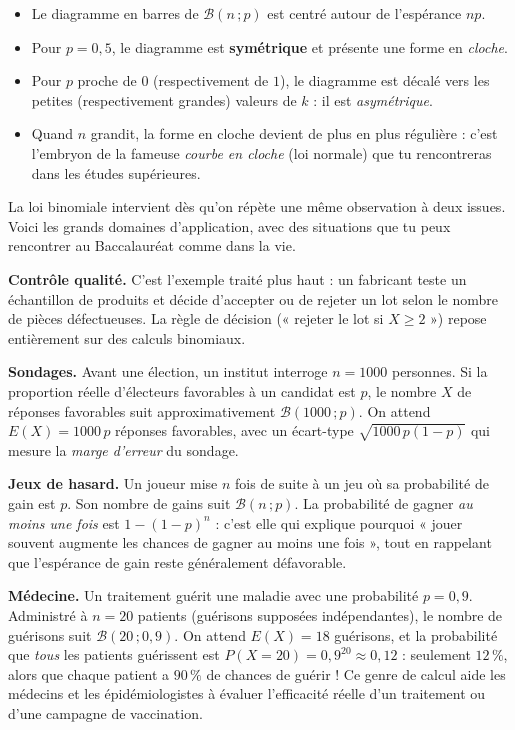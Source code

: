 \documentclass[11pt]{article}
\newcounter{popsec}
\newcounter{popsub}
\newcommand{\courssub}[1]{%
  \stepcounter{popsub}%
  \par\vspace{9pt}\noindent{\popxbold\fontsize{11.5}{13}\selectfont\color{popink}{\color{poporange}\thepopsec.\thepopsub}\hspace{6pt}#1}\par\nopagebreak\vspace{4pt}
}
\begin{document}
\begin{aretenir}
\begin{itemize}
\item Le diagramme en barres de $\mathcal{B}(n\,;p)$ est centré autour de l'espérance $np$.
\item Pour $p = 0{,}5$, le diagramme est \textbf{symétrique} et présente une forme en \emph{cloche}.
\item Pour $p$ proche de $0$ (respectivement de $1$), le diagramme est décalé vers les petites (respectivement grandes) valeurs de $k$ : il est \emph{asymétrique}.
\item Quand $n$ grandit, la forme en cloche devient de plus en plus régulière : c'est l'embryon de la fameuse \emph{courbe en cloche} (loi normale) que tu rencontreras dans les études supérieures.
\end{itemize}
\end{aretenir}

\courssub{Applications de la loi binomiale}

La loi binomiale intervient dès qu'on répète une même observation à deux issues. Voici les grands domaines d'application, avec des situations que tu peux rencontrer au Baccalauréat comme dans la vie.

\textbf{Contrôle qualité.} C'est l'exemple traité plus haut : un fabricant teste un échantillon de produits et décide d'accepter ou de rejeter un lot selon le nombre de pièces défectueuses. La règle de décision (« rejeter le lot si $X \geq 2$ ») repose entièrement sur des calculs binomiaux.

\textbf{Sondages.} Avant une élection, un institut interroge $n = 1000$ personnes. Si la proportion réelle d'électeurs favorables à un candidat est $p$, le nombre $X$ de réponses favorables suit approximativement $\mathcal{B}(1000\,;p)$. On attend $E(X) = 1000\,p$ réponses favorables, avec un écart-type $\sqrt{1000\,p(1-p)}$ qui mesure la \emph{marge d'erreur} du sondage.

\textbf{Jeux de hasard.} Un joueur mise $n$ fois de suite à un jeu où sa probabilité de gain est $p$. Son nombre de gains suit $\mathcal{B}(n\,;p)$. La probabilité de gagner \emph{au moins une fois} est $1-(1-p)^n$ : c'est elle qui explique pourquoi « jouer souvent augmente les chances de gagner au moins une fois », tout en rappelant que l'espérance de gain reste généralement défavorable.

\textbf{Médecine.} Un traitement guérit une maladie avec une probabilité $p = 0{,}9$. Administré à $n = 20$ patients (guérisons supposées indépendantes), le nombre de guérisons suit $\mathcal{B}(20\,;0{,}9)$. On attend $E(X) = 18$ guérisons, et la probabilité que \emph{tous} les patients guérissent est $P(X = 20) = 0{,}9^{20} \approx 0{,}12$ : seulement $12\,\%$, alors que chaque patient a $90\,\%$ de chances de guérir ! Ce genre de calcul aide les médecins et les épidémiologistes à évaluer l'efficacité réelle d'un traitement ou d'une campagne de vaccination.
\end{document}
